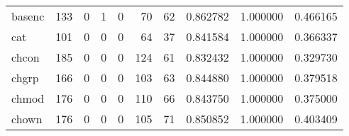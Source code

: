 \begin{tabular}{lrrrrrrrrr}
basenc    &                                   133 &                                                  0 &                                                  1 &                                                  0 &                                                 70 &                                                 62 &                                           0.862782 &                               1.000000 &                             0.466165 \\
cat       &                                   101 &                                                  0 &                                                  0 &                                                  0 &                                                 64 &                                                 37 &                                           0.841584 &                               1.000000 &                             0.366337 \\
chcon     &                                   185 &                                                  0 &                                                  0 &                                                  0 &                                                124 &                                                 61 &                                           0.832432 &                               1.000000 &                             0.329730 \\
chgrp     &                                   166 &                                                  0 &                                                  0 &                                                  0 &                                                103 &                                                 63 &                                           0.844880 &                               1.000000 &                             0.379518 \\
chmod     &                                   176 &                                                  0 &                                                  0 &                                                  0 &                                                110 &                                                 66 &                                           0.843750 &                               1.000000 &                             0.375000 \\
chown     &                                   176 &                                                  0 &                                                  0 &                                                  0 &                                                105 &                                                 71 &                                           0.850852 &                               1.000000 &                             0.403409 \\

\end{tabular}
